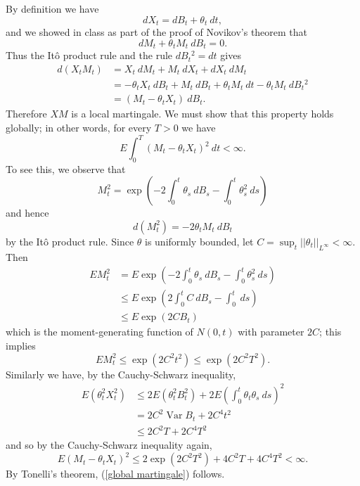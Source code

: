 \documentclass[10pt]{article}
\DeclareMathOperator{\Var}{Var}
\theoremstyle{definition}
\begin{document}
By definition we have
$$dX_t = dB_t + \theta_t ~dt,$$
and we showed in class as part of the proof of Novikov's theorem that
$$dM_t + \theta_t M_t ~dB_t = 0.$$
Thus the It\^o product rule and the rule $dB_t{}^2 = dt$ gives
\begin{align*}
d(X_tM_t) &= X_t ~dM_t + M_t ~dX_t + dX_t~dM_t\\
&= -\theta_t X_t ~dB_t + M_t ~dB_t + \theta_t M_t ~dt - \theta_t M_t ~dB_t{}^2\\
&= (M_t - \theta_tX_t) ~dB_t.
\end{align*}
Therefore $XM$ is a local martingale. We must show that this property holds globally; in other words, for every $T > 0$ we have
\begin{equation}
\label{global martingale}
E\int_0^T (M_t - \theta_tX_t)^2 ~dt < \infty.
\end{equation}
To see this, we observe that
$$M_t^2 = \exp\left(-2\int_0^t \theta_s ~dB_s - \int_0^t \theta_s^2 ~ds\right)$$
and hence
$$d(M_t^2) = -2\theta_tM_t ~dB_t$$
by the It\^o product rule.
Since $\theta$ is uniformly bounded, let $C = \sup_t ||\theta_t||_{L^\infty} < \infty$. Then
\begin{align*}
EM_t^2 &= E \exp\left(-2\int_0^t \theta_s ~dB_s - \int_0^t \theta_s^2 ~ds\right)\\
&\leq E \exp\left(2\int_0^t C~dB_s - \int_0^t ~ds\right)\\
&\leq E\exp(2CB_t)
\end{align*}
which is the moment-generating function of $N(0, t)$ with parameter $2C$; this implies
$$EM_t^2 \leq \exp(2C^2t^2) \leq \exp(2C^2T^2).$$
Similarly we have, by the Cauchy-Schwarz inequality,
\begin{align*}
E(\theta_t^2X_t^2) &\leq 2E(\theta_t^2 B_t^2) + 2E\left(\int_0^t \theta_t \theta_s ~ds\right)^2\\
&= 2C^2 \Var B_t + 2C^4t^2\\
&\leq 2C^2T + 2C^4T^2
\end{align*}
and so by the Cauchy-Schwarz inequality again,
$$E(M_t - \theta_t X_t)^2 \leq 2\exp(2C^2T^2) + 4C^2T + 4C^4T^2 < \infty.$$
By Tonelli's theorem, (\ref{global martingale}) follows.
\end{document}
